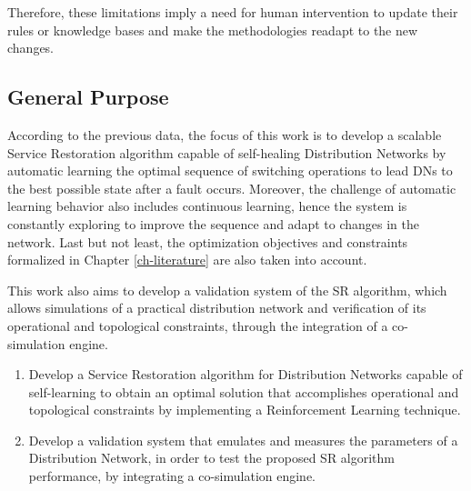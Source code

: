 Therefore, these limitations imply a need for human intervention to update their rules or knowledge bases 
and make the methodologies readapt to the new changes.

\subsection{General Purpose}

According to the previous data, the focus of this work is to develop a scalable Service Restoration algorithm 
capable of self-healing Distribution Networks by automatic learning the optimal sequence of switching 
operations to lead DNs to the best possible state after a fault occurs. Moreover, 
the challenge of automatic learning behavior also includes continuous learning, hence the system is 
constantly exploring to improve the sequence and adapt to changes in the network. Last but not least, 
the optimization objectives and constraints formalized in Chapter \ref{ch-literature} are also taken into account.

This work also aims to develop a validation system of the SR algorithm, which allows simulations of a 
practical distribution network and verification of its operational and topological constraints, 
through the integration of a co-simulation engine. 

\begin{enumerate}[
    labelindent=*,
    style=multiline,
    leftmargin=*,
    label=\textbf{Objective~\arabic*}]
        \item Develop a Service Restoration algorithm for Distribution Networks capable of self-learning to obtain an optimal solution that accomplishes operational and topological constraints by implementing a Reinforcement Learning technique.
        \item Develop a validation system that emulates and measures the parameters of a Distribution Network, in order to test the proposed SR algorithm performance, by integrating a co-simulation engine.
\end{enumerate}
    

